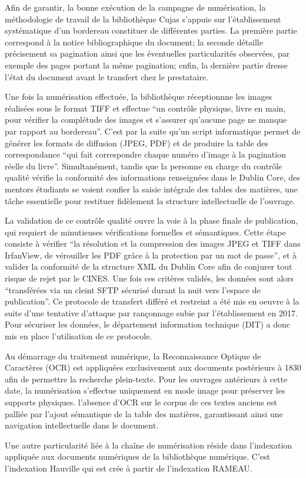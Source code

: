 Afin de garantir, la bonne exécution de la campagne de numérisation, la méthodologie de travail de la bibliothèque Cujas s'appuie sur l'établissement systématique d'un bordereau constituer de différentes parties. La première partie correspond à la notice bibliographique du document; la seconde détaille précisement sa pagination ainsi que les éventuelles particularités observées, par exemple des pages portant la même pagination; enfin, la dernière partie dresse l'état du document avant le transfert chez le prestataire.

Une fois la numérisation effectuée, la bibliothèque réceptionnne les images réalisées sous le format TIFF et effectue \enquote{un contrôle physique, livre en main, pour vérifier la complétude des images et s'assurer qu'aucune page ne manque par rapport au bordereau}. C'est par la suite qu'un script informatique permet de générer les formats de diffusion (JPEG, PDF) et de produire la table des correspondance \enquote{qui fait correspondre chaque numéro d'image à la pagination réelle du livre}. Simultanément, tandis que la personne en charge du contrôle qualité vérifie la conformité des informations renseignées dans le Dublin Core, des mentors étudiants se voient confier la saisie intégrale des tables des matières, une tâche essentielle pour restituer fidèlement la structure intellectuelle de l'ouvrage. 

La validation de ce contrôle qualité ouvre la voie à la phase finale de publication, qui requiert de minutieuses vérifications formelles et sémantiques. Cette étape consiste à vérifier \enquote{la résolution et la compression des images JPEG et TIFF dans IrfanView, de vérouiller les PDF grâce à la protection par un mot de passe}, et à valider la conformité de la structure XML du Dublin Core afin de conjurer tout risque de rejet par le CINES. Une fois ces critères validés, les données sont alors \enquote{transférées via un cleint SFTP sécurisé durant la nuit vers l'espace de publication}. Ce protocole de transfert différé et restreint a été mis en oeuvre à la suite d'une tentative d'attaque par rançonnage subie par l'établissement en 2017. Pour sécuriser les données, le département information technique (DIT) a donc mis en place l'utilisation de ce protocole. 

Au démarrage du traitement numérique, la Reconnaissance Optique de Caractères (OCR) est appliquées exclusivement aux documents postérieurs à 1830 afin de permettre la recherche plein-texte. Pour les ouvrages antérieurs à cette date, la numérisation s'effectue uniquement en mode image pour préserver les supports physiques. l'absence d'OCR sur le corpus de ces textes anciens est palliée par l'ajout sémantique de la table des matières, garantissant ainsi une navigation intellectuelle dans le document.

Une autre particularité liée à la chaîne de numérisation réside dans l'indexation appliquée aux documents numériques de la bibliothèque numérique. C'est l'indexation Hauville qui est crée à partir de l'indexation RAMEAU. 